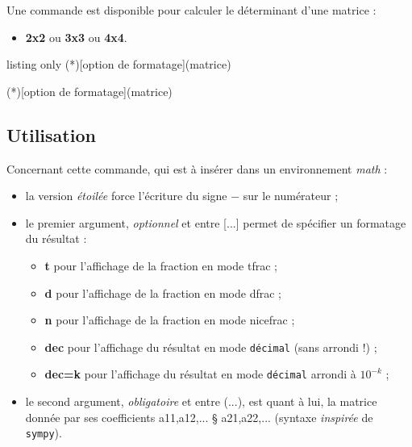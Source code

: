 \documentclass[french,a4paper,11pt]{article}
\newcommand\Cle[1]{{\bfseries\sffamily\textlangle #1\textrangle}}
\newcommand\cmaj[1]{\tcbox[vignetteMaJ]{#1}\xspace}
\begin{document}
\begin{cautionblock}
Une commande est disponible pour calculer le déterminant d'une matrice :

\begin{itemize}
	\item \textbf{2x2} ou \textbf{3x3} ou \textbf{4x4}.
\end{itemize}
\vspace*{-\baselineskip}\leavevmode
\end{cautionblock}

\begin{PresentationCode}{listing only}
\DetMatrice(*)[option de formatage](matrice)

\DetMatricePY(*)[option de formatage](matrice)
\end{PresentationCode}

\subsection{Utilisation}

\begin{tipblock}
Concernant cette commande, qui est à insérer dans un environnement \textit{math} :

\begin{itemize}
	\item \cmaj{0.1.3} la version \textit{étoilée} force l'écriture du signe \og $-$ \fg{} sur le numérateur ;
	\item le premier argument, \textit{optionnel} et entre \textsf{[...]} permet de spécifier un formatage du résultat :
	\begin{itemize}
		\item \Cle{t} pour l'affichage de la fraction en mode \textsf{tfrac} ;
		\item \Cle{d} pour l'affichage de la fraction en mode \textsf{dfrac} ;
		\item \Cle{n} pour l'affichage de la fraction en mode \textsf{nicefrac} ;
		\item \Cle{dec} pour l'affichage du résultat en mode \texttt{décimal} (sans arrondi !) ;
		\item \Cle{dec=k} pour l'affichage du résultat en mode \texttt{décimal} arrondi à $10^{-k}$ ;
	\end{itemize}
	\item le second argument, \textit{obligatoire} et entre \textsf{(...)}, est quant à lui, la matrice donnée par ses coefficients \textsf{a11,a12,... § a21,a22,...} (syntaxe \textit{inspirée} de \texttt{sympy}).
\end{itemize}
\vspace*{-\baselineskip}\leavevmode
\end{tipblock}
\end{document}
